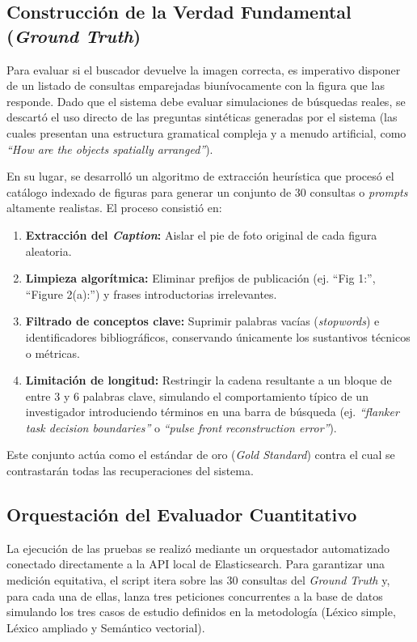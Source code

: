 \documentclass[../main.tex]{subfiles}
\begin{document}
\subsection{Construcción de la Verdad Fundamental (\textit{Ground Truth})}
Para evaluar si el buscador devuelve la imagen correcta, es imperativo disponer de un listado de consultas emparejadas biunívocamente con la figura que las responde. Dado que el sistema debe evaluar simulaciones de búsquedas reales, se descartó el uso directo de las preguntas sintéticas generadas por el sistema (las cuales presentan una estructura gramatical compleja y a menudo artificial, como \textit{``How are the objects spatially arranged''}).

En su lugar, se desarrolló un algoritmo de extracción heurística que procesó el catálogo indexado de figuras para generar un conjunto de 30 consultas o \textit{prompts} altamente realistas. El proceso consistió en:
\begin{enumerate}
    \item \textbf{Extracción del \textit{Caption}:} Aislar el pie de foto original de cada figura aleatoria.
    \item \textbf{Limpieza algorítmica:} Eliminar prefijos de publicación (ej. ``Fig 1:'', ``Figure 2(a):'') y frases introductorias irrelevantes.
    \item \textbf{Filtrado de conceptos clave:} Suprimir palabras vacías (\textit{stopwords}) e identificadores bibliográficos, conservando únicamente los sustantivos técnicos o métricas.
    \item \textbf{Limitación de longitud:} Restringir la cadena resultante a un bloque de entre 3 y 6 palabras clave, simulando el comportamiento típico de un investigador introduciendo términos en una barra de búsqueda (ej. \textit{``flanker task decision boundaries''} o \textit{``pulse front reconstruction error''}).
\end{enumerate}

Este conjunto actúa como el estándar de oro (\textit{Gold Standard}) contra el cual se contrastarán todas las recuperaciones del sistema.

\subsection{Orquestación del Evaluador Cuantitativo}
La ejecución de las pruebas se realizó mediante un orquestador automatizado conectado directamente a la API local de Elasticsearch. Para garantizar una medición equitativa, el script itera sobre las 30 consultas del \textit{Ground Truth} y, para cada una de ellas, lanza tres peticiones concurrentes a la base de datos simulando los tres casos de estudio definidos en la metodología (Léxico simple, Léxico ampliado y Semántico vectorial).
\end{document}
